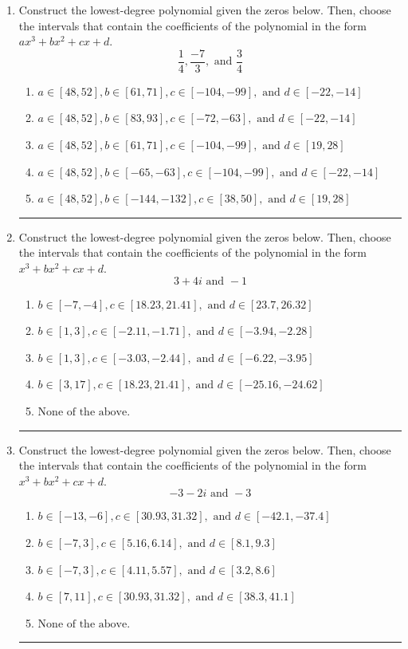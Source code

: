 \documentclass[14pt]{extbook}
\newcommand{\litem}[1]{\item#1\hspace*{-1cm}\rule{\textwidth}{0.4pt}}
\begin{document}
\begin{enumerate}
{\begin{enumerate}[label=\Alph*.]
\end{enumerate} }
\litem{
Construct the lowest-degree polynomial given the zeros below. Then, choose the intervals that contain the coefficients of the polynomial in the form $ax^3+bx^2+cx+d$.\[ \frac{1}{4}, \frac{-7}{3}, \text{ and } \frac{3}{4} \]\begin{enumerate}[label=\Alph*.]
\item \( a \in [48, 52], b \in [61, 71], c \in [-104, -99], \text{ and } d \in [-22, -14] \)
\item \( a \in [48, 52], b \in [83, 93], c \in [-72, -63], \text{ and } d \in [-22, -14] \)
\item \( a \in [48, 52], b \in [61, 71], c \in [-104, -99], \text{ and } d \in [19, 28] \)
\item \( a \in [48, 52], b \in [-65, -63], c \in [-104, -99], \text{ and } d \in [-22, -14] \)
\item \( a \in [48, 52], b \in [-144, -132], c \in [38, 50], \text{ and } d \in [19, 28] \)

\end{enumerate} }
\litem{
Construct the lowest-degree polynomial given the zeros below. Then, choose the intervals that contain the coefficients of the polynomial in the form $x^3+bx^2+cx+d$.\[ 3 + 4 i \text{ and } -1 \]\begin{enumerate}[label=\Alph*.]
\item \( b \in [-7, -4], c \in [18.23, 21.41], \text{ and } d \in [23.7, 26.32] \)
\item \( b \in [1, 3], c \in [-2.11, -1.71], \text{ and } d \in [-3.94, -2.28] \)
\item \( b \in [1, 3], c \in [-3.03, -2.44], \text{ and } d \in [-6.22, -3.95] \)
\item \( b \in [3, 17], c \in [18.23, 21.41], \text{ and } d \in [-25.16, -24.62] \)
\item \( \text{None of the above.} \)

\end{enumerate} }
\litem{
Construct the lowest-degree polynomial given the zeros below. Then, choose the intervals that contain the coefficients of the polynomial in the form $x^3+bx^2+cx+d$.\[ -3 - 2 i \text{ and } -3 \]\begin{enumerate}[label=\Alph*.]
\item \( b \in [-13, -6], c \in [30.93, 31.32], \text{ and } d \in [-42.1, -37.4] \)
\item \( b \in [-7, 3], c \in [5.16, 6.14], \text{ and } d \in [8.1, 9.3] \)
\item \( b \in [-7, 3], c \in [4.11, 5.57], \text{ and } d \in [3.2, 8.6] \)
\item \( b \in [7, 11], c \in [30.93, 31.32], \text{ and } d \in [38.3, 41.1] \)
\item \( \text{None of the above.} \)


\end{enumerate}}
\end{enumerate}
\end{document}
